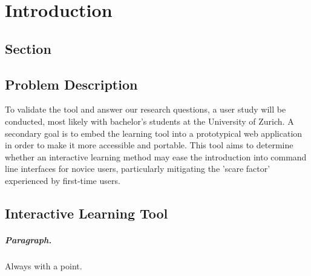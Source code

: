 \chapter{Introduction}
\label{chap:intro}
\section{Section}
\section{Problem Description}

To validate the tool and answer our
research questions, a user study will be conducted, most likely with bachelor's
students at the University of Zurich. A secondary goal is to embed the learning
tool into a prototypical web application in order to make it more accessible
and portable.
This tool aims to determine whether an interactive learning method may ease the
introduction into command line interfaces for novice users, particularly
mitigating the 'scare factor' experienced by first-time users. 
\section{Interactive Learning Tool}

\paragraph{Paragraph.} Always with a point.

